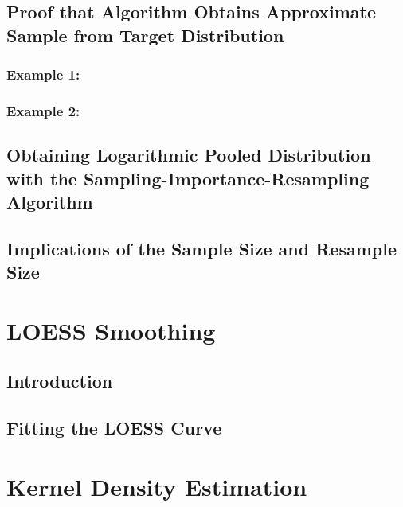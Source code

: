 \documentclass[12pt,twoside]{smiththesis}
\begin{document}
\hypertarget{proof}{%
\subsection{Proof that Algorithm Obtains Approximate Sample from Target Distribution}\label{proof}}

\hypertarget{example-1}{%
\subsubsection{Example 1:}\label{example-1}}

\hypertarget{example-2}{%
\subsubsection{Example 2:}\label{example-2}}

\hypertarget{logpooled}{%
\subsection{Obtaining Logarithmic Pooled Distribution with the Sampling-Importance-Resampling Algorithm}\label{logpooled}}

\hypertarget{presamp}{%
\subsection{Implications of the Sample Size and Resample Size}\label{presamp}}

\hypertarget{loess-smoothing}{%
\section{LOESS Smoothing}\label{loess-smoothing}}

\hypertarget{introduction-1}{%
\subsection{Introduction}\label{introduction-1}}

\hypertarget{fitting-the-loess-curve}{%
\subsection{Fitting the LOESS Curve}\label{fitting-the-loess-curve}}

\hypertarget{kernel-density-estimation}{%
\section{Kernel Density Estimation}\label{kernel-density-estimation}}
\end{document}
